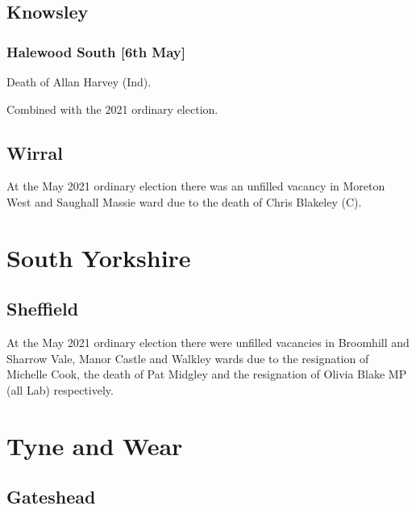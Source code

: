 \documentclass[a4paper,openany]{book}
\begin{document}
\begin{resultsiii}
\subsection*{Knowsley}

\subsubsection*{Halewood South \hspace*{\fill}\nolinebreak[1]%
	\enspace\hspace*{\fill}
	[6th May]}


Death of Allan Harvey (Ind).

Combined with the 2021 ordinary election.

\subsection*{Wirral}

At the May 2021 ordinary election there was an unfilled vacancy in Moreton West and Saughall Massie ward due to the death of Chris Blakeley (C).

\section{South Yorkshire}

\subsection*{Sheffield}

At the May 2021 ordinary election there were unfilled vacancies in Broomhill and Sharrow Vale, Manor Castle and Walkley wards due to the resignation of Michelle Cook, the death of Pat Midgley and the resignation of Olivia Blake MP (all Lab) respectively.

\section{Tyne and Wear}

\subsection*{Gateshead}


\end{resultsiii}
\end{document}
